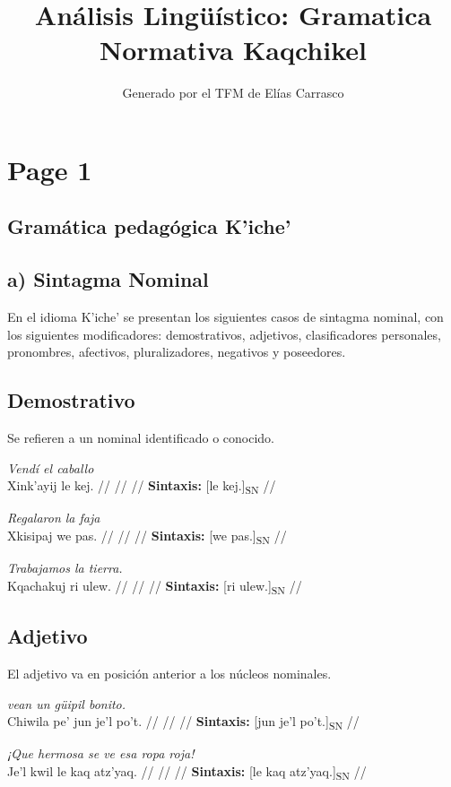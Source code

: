 \documentclass{article}%
\title{Análisis Lingüístico: Gramatica Normativa Kaqchikel}%
\author{Generado por el TFM de Elías Carrasco}%
\begin{document}
%
\normalsize%
\maketitle%
\section{Page 1}%
\label{sec:Page1}%
\subsection{Gramática pedagógica K'iche'}%
\label{subsec:GramticapedaggicaKiche}%

%
\subsection{a) Sintagma Nominal}%
\label{subsec:a)SintagmaNominal}%

%
En el idioma K'iche' se presentan los siguientes casos de sintagma nominal, con los %
siguientes modificadores: demostrativos, adjetivos, clasificadores personales, pronombres, %
afectivos, pluralizadores, negativos y poseedores. %
\subsection{Demostrativo}%
\label{subsec:Demostrativo}%

%
Se refieren a un nominal identificado o conocido. %
\par\medskip%
\ex
\textit{Vendí el caballo} \\
\begingl
\gla Xink'ayij le kej. //
\glb  //
\glc  //
\glft \textbf{Sintaxis:} [le kej.]\textsubscript{SN} //
\endgl
\xe
%
\medskip%
\par\medskip%
\ex
\textit{Regalaron la faja} \\
\begingl
\gla Xkisipaj we pas. //
\glb  //
\glc  //
\glft \textbf{Sintaxis:} [we pas.]\textsubscript{SN} //
\endgl
\xe
%
\medskip%
\par\medskip%
\ex
\textit{Trabajamos la tierra.} \\
\begingl
\gla Kqachakuj ri ulew. //
\glb  //
\glc  //
\glft \textbf{Sintaxis:} [ri ulew.]\textsubscript{SN} //
\endgl
\xe
%
\medskip%
\subsection{Adjetivo}%
\label{subsec:Adjetivo}%

%
El adjetivo va en posición anterior a los núcleos nominales. %
\par\medskip%
\ex
\textit{vean un güipil bonito.} \\
\begingl
\gla Chiwila pe' jun je'l po't. //
\glb  //
\glc  //
\glft \textbf{Sintaxis:} [jun je'l po't.]\textsubscript{SN} //
\endgl
\xe
%
\medskip%
\par\medskip%
\ex
\textit{¡Que hermosa se ve esa ropa roja!} \\
\begingl
\gla Je'l kwil le kaq atz'yaq. //
\glb  //
\glc  //
\glft \textbf{Sintaxis:} [le kaq atz'yaq.]\textsubscript{SN} //
\endgl
\xe
%
\medskip%
\end{document}
